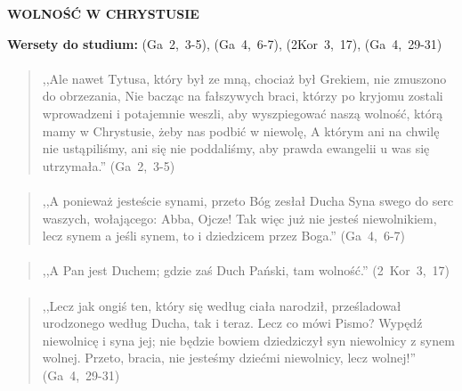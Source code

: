 \documentclass[10pt,a4paper,oneside]{article}
\begin{document}
\centerline{\textbf{\MakeUppercase{Wolność w Chrystusie}}}
\begin{center}
\textbf{Wersety do studium:} 
\mbox{(Ga 2, 3-5)}, \mbox{(Ga 4, 6-7)}, \mbox{(2Kor 3, 17)}, \mbox{(Ga 4, 29-31)}
\end{center}
\paragraph{}
\begin{quote}
,,Ale nawet Tytusa, który był ze mną, chociaż był Grekiem, nie zmuszono do obrzezania, Nie bacząc na fałszywych braci, którzy po kryjomu zostali wprowadzeni i potajemnie weszli, aby wyszpiegować naszą wolność, którą mamy w Chrystusie, żeby nas podbić w niewolę, A którym ani na chwilę nie ustąpiliśmy, ani się nie poddaliśmy, aby prawda ewangelii u was się utrzymała.'' \mbox{(Ga 2, 3-5)}
\end{quote}
\paragraph{}
\begin{quote}
,,A ponieważ jesteście synami, przeto Bóg zesłał Ducha Syna swego do serc waszych, wołającego: Abba, Ojcze! Tak więc już nie jesteś niewolnikiem, lecz synem a jeśli synem, to i dziedzicem przez Boga.'' \mbox{(Ga 4, 6-7)}
\end{quote}
\paragraph{}
\begin{quote}
,,A Pan jest Duchem; gdzie zaś Duch Pański, tam wolność.'' \mbox{(2 Kor 3, 17)}
\end{quote}
\paragraph{}
\begin{quote}
,,Lecz jak ongiś ten, który się według ciała narodził, prześladował urodzonego według Ducha, tak i teraz. Lecz co mówi Pismo? Wypędź niewolnicę i syna jej; nie będzie bowiem dziedziczył syn niewolnicy z synem wolnej. Przeto, bracia, nie jesteśmy dziećmi niewolnicy, lecz wolnej!'' \mbox{(Ga 4, 29-31)}
\end{quote}
\end{document}
